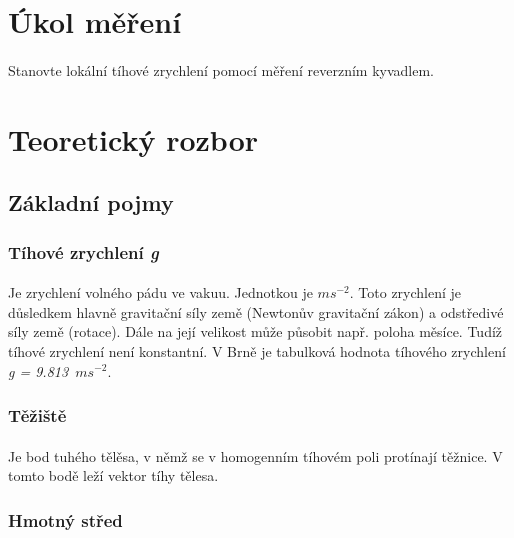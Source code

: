\documentclass{praktikum}
\begin{document}
\maketitle
\vspace{0.5 cm}


\section{Úkol měření}
\paragraph{}
Stanovte lokální tíhové zrychlení pomocí měření reverzním kyvadlem.
\section{Teoretický rozbor}

\subsection{Základní pojmy}

\subsubsection{Tíhové zrychlení \textit{g}} 
\paragraph{}Je zrychlení volného pádu ve vakuu. Jednotkou je $ms^{-2}$. Toto zrychlení je důsledkem hlavně gravitační síly země (Newtonův gravitační zákon) a odstředivé síly země (rotace). Dále na její velikost může působit např. poloha měsíce. Tudíž tíhové zrychlení není konstantní. V Brně je tabulková hodnota tíhového zrychlení \textit{g = 9.813~$ms^{-2}$}.

\subsubsection{Těžiště}
\paragraph{} Je bod tuhého tělěsa, v němž se v homogenním tíhovém poli protínají těžnice. V tomto bodě leží vektor tíhy tělesa.

\subsubsection{Hmotný střed}
\end{document}

